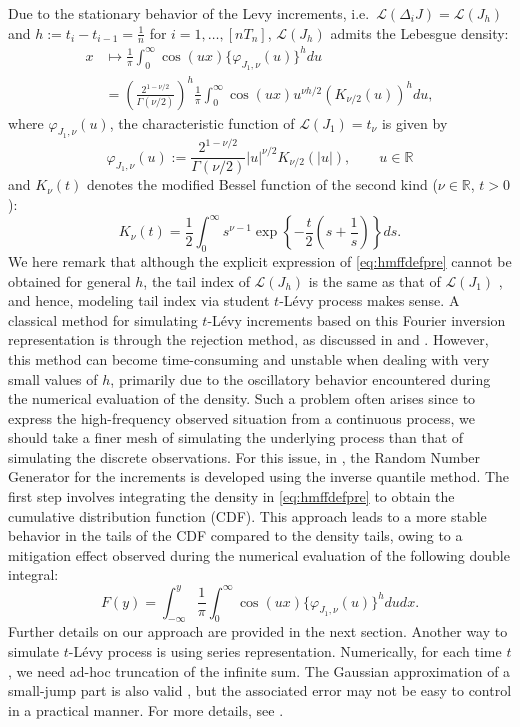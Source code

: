 Due to the stationary behavior of the L\textquotesingle evy increments, i.e.~\(\mathcal{L}(\Delta_i J) = \mathcal{L}(J_h)\)
and \(h:=t_i-t_{i-1}=\frac{1}{n}\) for \(i = 1,\ldots, [nT_n]\), \(\mathcal{L}(J_h)\) admits the Lebesgue density:
\begin{align}
x &\mapsto
\frac{1}{\pi}\int_0^\infty \cos(ux)\{\varphi_{J_1,\nu}(u)\}^h du
\nonumber\\
&= \left(\frac{2^{1-\nu/2}}{\Gamma(\nu/2)} \right)^h
\frac{1}{\pi}\int_0^\infty \cos(ux) u^{\nu h/2} \left(K_{\nu/2}(u)\right)^h du,
\label{eq:hmffdefpre}
\end{align}
where \(\varphi_{J_1,\nu}(u)\), the characteristic function of \(\mathcal{L}(J_1)=t_\nu\) is given by
\begin{equation}
\varphi_{J_1,\nu}(u) := \frac{2^{1-\nu/2}}{\Gamma(\nu/2)} |u|^{\nu/2} K_{\nu/2}(|u|), \qquad u\in\mathbb{R}
\label{eq:hmtnuCF}
\end{equation}
and \(K_\nu(t)\) denotes the modified Bessel function of the second kind (\(\nu\in\mathbb{R}\), \(t>0\)):
\begin{equation*}
K_{\nu}(t)=\frac{1}{2}\int_0^{\infty}s^{\nu-1}\exp\left\{-\frac{t}{2}\left(s+\frac{1}{s}\right)\right\}ds.
\end{equation*}
We here remark that although the explicit expression of \eqref{eq:hmffdefpre} cannot be obtained for general \(h\), the tail index of \(\mathcal{L}(J_h)\) is the same as that of \(\mathcal{L}(J_1)\) \citep[ Theorem 2]{BerVig08}, and hence, modeling tail index via student \(t\)-Lévy process makes sense.
A classical method for simulating \(t\)-Lévy increments based on this Fourier inversion representation is through the rejection method, as discussed in \citet{Hubalek2005OnSF} and \citet{Dev81}. However, this method can become time-consuming and unstable when dealing with very small values of \(h\), primarily due to the oscillatory behavior encountered during the numerical evaluation of the density.
Such a problem often arises since to express the high-frequency observed situation from a continuous process, we should take a finer mesh of simulating the underlying process than that of simulating the discrete observations.
For this issue, in , the Random Number Generator for the increments is developed using the inverse quantile method. The first step involves integrating the density in \eqref{eq:hmffdefpre} to obtain the cumulative distribution function (CDF). This approach leads to a more stable behavior in the tails of the CDF compared to the density tails, owing to a mitigation effect observed during the numerical evaluation of the following double integral:
\begin{equation*}
F(y) =\int_{-\infty}^{y} \frac{1}{\pi}\int_0^\infty \cos(ux)\{\varphi_{J_1,\nu}(u)\}^h du dx.
\end{equation*}
Further details on our approach are provided in the next section.
Another way to simulate \(t\)-Lévy process is using series representation. Numerically, for each time \(t\), we need ad-hoc truncation of the infinite sum.
The Gaussian approximation of a small-jump part is also valid \citep{AsmRos01}, but the associated error may not be easy to control in a practical manner.
For more details, see \citet{Mass18}.

